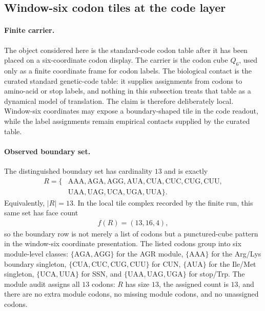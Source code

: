 \subsection{Window-six codon tiles at the code layer}
\label{subsec:codon-window-six-local-tile-boundary}

\paragraph{Finite carrier.}
The object considered here is the standard-code codon table after it has been placed on a six-coordinate codon display. The carrier is the codon cube $Q_6$, used only as a finite coordinate frame for codon labels. The biological contact is the curated standard genetic-code table: it supplies assignments from codons to amino-acid or stop labels, and nothing in this subsection treats that table as a dynamical model of translation. The claim is therefore deliberately local. Window-six coordinates may expose a boundary-shaped tile in the code readout, while the label assignments remain empirical contacts supplied by the curated table.

\paragraph{Observed boundary set.}
The distinguished boundary set has cardinality $13$ and is exactly
$$
\begin{aligned}
R=\{&\mathrm{AAA},\mathrm{AGA},\mathrm{AGG},\mathrm{AUA},\mathrm{CUA},\mathrm{CUC},\mathrm{CUG},\mathrm{CUU},\\
&\mathrm{UAA},\mathrm{UAG},\mathrm{UCA},\mathrm{UGA},\mathrm{UUA}\}.
\end{aligned}
$$
Equivalently, $|R|=13$. In the local tile complex recorded by the finite run, this same set has face count
$$
\begin{aligned}
f(R)=(13,16,4),
\end{aligned}
$$
so the boundary row is not merely a list of codons but a punctured-cube pattern in the window-six coordinate presentation. The listed codons group into six module-level classes: $\{\mathrm{AGA},\mathrm{AGG}\}$ for the AGR module, $\{\mathrm{AAA}\}$ for the Arg/Lys boundary singleton, $\{\mathrm{CUA},\mathrm{CUC},\mathrm{CUG},\mathrm{CUU}\}$ for CUN, $\{\mathrm{AUA}\}$ for the Ile/Met singleton, $\{\mathrm{UCA},\mathrm{UUA}\}$ for SSN, and $\{\mathrm{UAA},\mathrm{UAG},\mathrm{UGA}\}$ for stop/Trp. The module audit assigns all $13$ codons: $R$ has size $13$, the assigned count is $13$, and there are no extra module codons, no missing module codons, and no unassigned codons.

